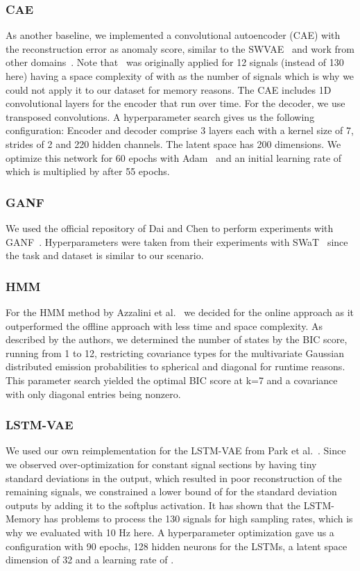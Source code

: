 \documentclass[journal]{IEEEtran}
\begin{document}
\subsubsection{CAE}
As another baseline, we implemented a convolutional autoencoder (CAE) with the  reconstruction error as anomaly score, similar to the SWVAE~\cite{swvae} and work from other domains~\cite{chen2018autoencoder, ae_ssim, itae, memae}.
Note that~\cite{swvae} was originally applied for 12 signals (instead of 130 here) having a space complexity of  with  as the number of signals which is why we could not apply it to our dataset for memory reasons.
The CAE includes 1D convolutional layers for the encoder that run over time.
For the decoder, we use transposed convolutions.
A hyperparameter search gives us the following configuration:
Encoder and decoder comprise 3 layers each with a kernel size of 7, strides of 2 and 220 hidden channels.
The latent space has 200 dimensions.
We optimize this network for 60 epochs with Adam~\cite{adam} and an initial learning rate of  which is multiplied by  after 55 epochs.
{
\subsubsection{GANF}
We used the official repository of Dai and Chen to perform experiments with GANF~\cite{GANF}.
Hyperparameters were taken from their experiments with SWaT~\cite{swat} since the task and dataset is similar to our scenario.
\subsubsection{HMM}
For the HMM method by Azzalini et al.~\cite{hmm_ad} we decided for the online approach as it outperformed the offline approach with less time and space complexity.
As described by the authors, we determined the number of states by the BIC score, running  from 1 to 12, restricting covariance types for the multivariate Gaussian distributed emission probabilities to spherical and diagonal for runtime reasons.
This parameter search yielded the optimal BIC score at k=7 and a covariance with only diagonal entries being nonzero.
\subsubsection{LSTM-VAE}
We used our own reimplementation for the LSTM-VAE from Park et al.~\cite{park2018multimodal}.
Since we observed over-optimization for constant signal sections by having tiny standard deviations in the output, which resulted in poor reconstruction of the remaining signals, we constrained a lower bound of  for the standard deviation outputs by adding it to the softplus activation.
It has shown that the LSTM-Memory has problems to process the 130 signals for high sampling rates, which is why we evaluated with 10 Hz here.
A hyperparameter optimization gave us a configuration with 90 epochs, 128 hidden neurons for the LSTMs, a latent space dimension of 32 and a learning rate of .}
\end{document}
